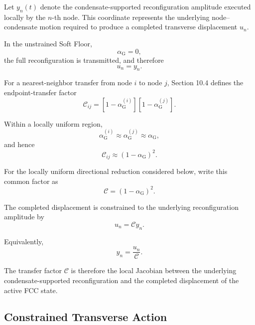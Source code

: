 Let $y_n(t)$ denote the condensate-supported reconfiguration amplitude executed locally by the $n$-th node. This coordinate represents the underlying node--condensate motion required to produce a completed transverse displacement $u_n$.

In the unstrained Soft Floor,
\begin{equation}
    \alpha_{\mathrm{G}} = 0,
\end{equation}
the full reconfiguration is transmitted, and therefore
\begin{equation}
    u_n = y_n.
\end{equation}

For a nearest-neighbor transfer from node $i$ to node $j$, Section 10.4 defines the endpoint-transfer factor
\begin{equation}
    \boxed{ \mathcal{C}_{ij} = \left[ 1-\alpha_{\mathrm{G}}^{(i)} \right] \left[ 1-\alpha_{\mathrm{G}}^{(j)} \right] }.
\end{equation}

Within a locally uniform region,
\begin{equation}
    \alpha_{\mathrm{G}}^{(i)} \approx \alpha_{\mathrm{G}}^{(j)} \approx \alpha_{\mathrm{G}},
\end{equation}
and hence
\begin{equation}
    \mathcal{C}_{ij} \approx \left( 1-\alpha_{\mathrm{G}} \right)^2.
\end{equation}

For the locally uniform directional reduction considered below, write this common factor as
\begin{equation}
    \mathcal{C} = \left( 1-\alpha_{\mathrm{G}} \right)^2.
\end{equation}

The completed displacement is constrained to the underlying reconfiguration amplitude by
\begin{equation}
    \boxed{ u_n = \mathcal{C} y_n }.
\end{equation}

Equivalently,
\begin{equation}
    y_n = \frac{u_n}{\mathcal{C}}.
\end{equation}

The transfer factor $\mathcal{C}$ is therefore the local Jacobian between the underlying condensate-supported reconfiguration and the completed displacement of the active FCC state.

\subsection{Constrained Transverse Action}

